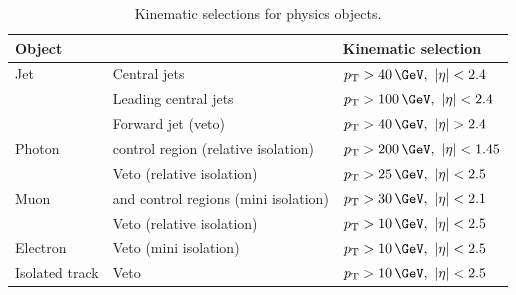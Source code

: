 \begin{table}[h!]
  \caption{Kinematic selections for physics objects.\label{tab:kine-sel}}
  \centering
  \footnotesize
  \begin{tabular}{ lll }
    \hline
    \hline
    Object 	& 	&Kinematic selection \\
    \hline
    \hline
    Jet  		&Central jets& $\pt > 40 \,\GeV,\ \etaabs < 2.4$		    \\
			&Leading central jets&	$\pt > 100 \,\GeV,\ \etaabs < 2.4$	\\	    	    
			&Forward jet (veto) &$\pt > 40 \,\GeV,\ \etaabs > 2.4$	\\	    
    Photon  		&\gj control region (relative isolation)& $\pt > 200 \,\GeV,\ \etaabs < 1.45$	\\	    
			&Veto (relative isolation)& $\pt > 25 \,\GeV,\ \etaabs < 2.5$		    \\
    Muon  		&\mj and \mmj control regions (mini isolation)& $\pt > 30 \,\GeV,\ \etaabs < 2.1$	\\	    
			&Veto (relative isolation)& $\pt > 10 \,\GeV,\ \etaabs < 2.5$		    \\
    Electron  		&Veto (mini isolation)& $\pt > 10 \,\GeV,\ \etaabs < 2.5$		    \\
    Isolated track  	&Veto& $\pt > 10 \,\GeV,\ \etaabs < 2.5$		    \\
		
    
    \hline
    \hline
  \end{tabular}
  \end{table}

